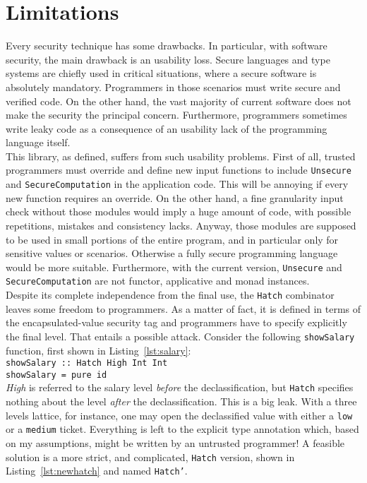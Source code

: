 \section{Limitations} \label{sec:limitations}
Every security technique has some drawbacks. In particular, with software security, the main drawback is an usability loss. Secure languages and type systems are chiefly used in critical situations, where a secure software is absolutely mandatory. Programmers in those scenarios must write secure and verified code. On the other hand, the vast majority of current software does not make the security the principal concern. Furthermore, programmers sometimes write leaky code as a consequence of an usability lack of the programming language itself. \\
This library, as defined, suffers from such usability problems. First of all, trusted programmers must override and define new input functions to include \texttt{Unsecure} and \texttt{SecureComputation} in the application code. This will be annoying if every new function requires an override. On the other hand, a fine granularity input check without those modules would imply a huge amount of code, with possible repetitions, mistakes and consistency lacks. Anyway, those modules are supposed to be used in small portions of the entire program, and in particular only for sensitive values or scenarios. Otherwise a fully secure programming language would be more suitable. Furthermore, with the current version, \texttt{Unsecure} and \texttt{SecureComputation} are not functor, applicative and monad instances. \\
Despite its complete independence from the final use, the \texttt{Hatch} combinator leaves some freedom to programmers. As a matter of fact, it is defined in terms of the encapsulated-value security tag and programmers have to specify explicitly the final level. That entails a possible attack. Consider the following \texttt{showSalary} function, first shown in Listing~\ref{lst:salary}: \\ \texttt{showSalary :: Hatch High Int Int\\showSalary = pure id} \\
\textit{High} is referred to the salary level \textit{before} the declassification, but \texttt{Hatch} specifies nothing about the level \textit{after} the declassification. This is a big leak. With a three levels lattice, for instance, one may open the declassified value with either a \texttt{low} or a \texttt{medium} ticket. Everything is left to the explicit type annotation which, based on my assumptions, might be written by an untrusted programmer! A feasible solution is a more strict, and complicated, \texttt{Hatch} version, shown in Listing~\ref{lst:newhatch} and named \texttt{Hatch'}.
